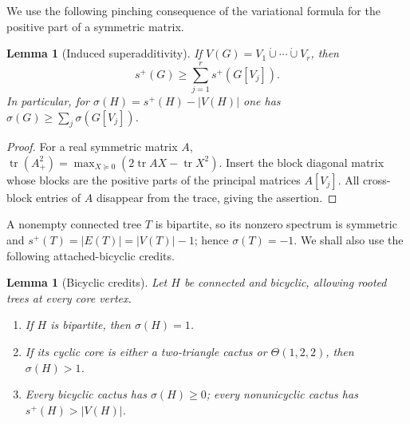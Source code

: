 \documentclass[11pt]{article}
\newtheorem{lemma}[theorem]{Lemma}
\theoremstyle{remark}
\newcommand{\splus}{s^+}
\begin{document}
We use the following pinching consequence of the variational formula for the
positive part of a symmetric matrix.

\begin{lemma}[Induced superadditivity]\label{lem:super}
If $V(G)=V_1\mathbin{\dot\cup}\cdots\mathbin{\dot\cup}V_r$, then
\[
 \splus(G)\geq\sum_{j=1}^r\splus(G[V_j]).
\]
In particular, for $\sigma(H)=\splus(H)-|V(H)|$ one has
$\sigma(G)\geq\sum_j\sigma(G[V_j])$.
\end{lemma}

\begin{proof}
For a real symmetric matrix $A$,
$\operatorname{tr}(A_+^2)=\max_{X\succeq0}
(2\operatorname{tr}AX-\operatorname{tr}X^2)$.  Insert the block diagonal
matrix whose blocks are the positive parts of the principal matrices
$A[V_j]$.  All cross-block entries of $A$ disappear from the trace, giving
the assertion.
\end{proof}

A nonempty connected tree $T$ is bipartite, so its nonzero spectrum is
symmetric and $\splus(T)=|E(T)|=|V(T)|-1$; hence $\sigma(T)=-1$.
We shall also use the following attached-bicyclic credits.

\begin{lemma}[Bicyclic credits]\label{lem:credits}
Let $H$ be connected and bicyclic, allowing rooted trees at every core
vertex.
\begin{enumerate}
 \item If $H$ is bipartite, then $\sigma(H)=1$.
 \item If its cyclic core is either a two-triangle cactus or
 $\Theta(1,2,2)$, then $\sigma(H)>1$.
 \item Every bicyclic cactus has $\sigma(H)\geq0$; every nonunicyclic cactus
 has $\splus(H)>|V(H)|$.
\end{enumerate}
\end{lemma}
\end{document}
